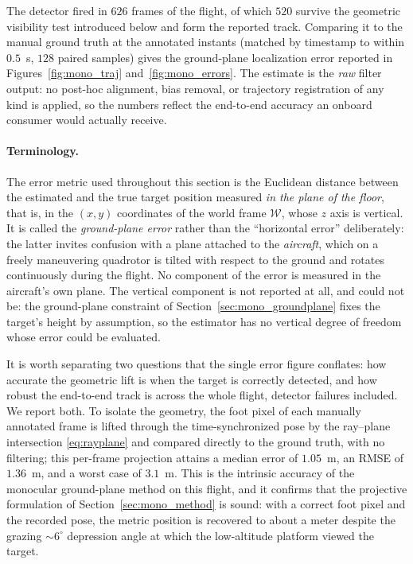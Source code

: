 The detector fired in $626$ frames of the flight, of which $520$ survive the
geometric visibility test introduced below and form the reported track. Comparing it to the manual ground truth at the annotated instants
(matched by timestamp to within $0.5$~s, $128$ paired samples) gives the
ground-plane localization error reported in Figures~\ref{fig:mono_traj}
and~\ref{fig:mono_errors}. The
estimate is the \emph{raw} filter output: no post-hoc alignment, bias removal, or
trajectory registration of any kind is applied, so the numbers reflect the
end-to-end accuracy an onboard consumer would actually receive.

\paragraph*{Terminology.} The error metric used throughout this section is the
Euclidean distance between the estimated and the true target position measured
\emph{in the plane of the floor}, that is, in the $(x,y)$ coordinates of the world
frame $\mathcal{W}$, whose $z$ axis is vertical. It is called the
\emph{ground-plane error} rather than the ``horizontal error'' deliberately: the
latter invites confusion with a plane attached to the \emph{aircraft}, which on a
freely maneuvering quadrotor is tilted with respect to the ground and rotates
continuously during the flight. No component of the error is measured in the
aircraft's own plane. The vertical component is not reported at all, and could not
be: the ground-plane constraint of Section~\ref{sec:mono_groundplane} fixes the
target's height by assumption, so the estimator has no vertical degree of freedom
whose error could be evaluated.

It is worth separating two questions that the single error figure conflates: how
accurate the geometric lift is when the target is correctly detected, and how
robust the end-to-end track is across the whole flight, detector failures
included. We report both. To isolate the geometry, the foot pixel of each
manually annotated frame is lifted through the time-synchronized pose by the
ray--plane intersection \eqref{eq:rayplane} and compared directly to the ground
truth, with no filtering; this per-frame projection attains a median error of
$1.05$~m, an RMSE of $1.36$~m, and a worst case of $3.1$~m. This is the intrinsic
accuracy of the monocular ground-plane method on this flight, and it confirms that
the projective formulation of Section~\ref{sec:mono_method} is sound: with a
correct foot pixel and the recorded pose, the metric position is recovered to
about a meter despite the grazing $\sim 6^\circ$ depression angle at which the
low-altitude platform viewed the target.

